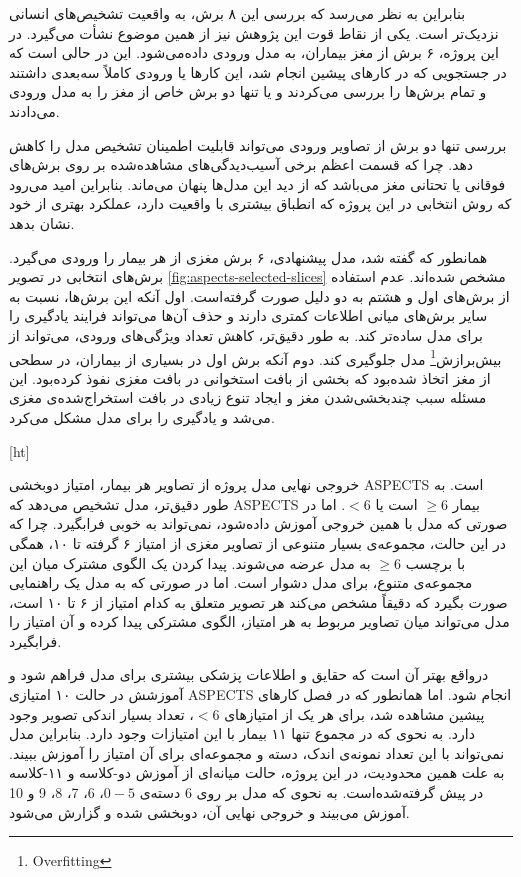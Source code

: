  بنابراین به نظر می‌رسد که بررسی این ۸ برش، به واقعیت تشخیص‌های انسانی نزدیک‌تر است.
 یکی از نقاط قوت این پژوهش نیز از همین موضوع نشأت می‌گیرد.
 در این پروژه، ۶ برش از مغز بیماران، به مدل ورودی داده‌می‌شود.
این در حالی است که در جستجویی که در کارهای پیشین
انجام شد، این کارها یا ورودی کاملاً سه‌بعدی داشتند و تمام برش‌ها را بررسی می‌کردند و یا تنها دو برش خاص از مغز را به مدل ورودی می‌دادند.

بررسی تنها دو برش از تصاویر ورودی می‌تواند قابلیت اطمینان تشخیص مدل را کاهش دهد.
چرا که قسمت اعظم برخی آسیب‌دیدگی‌های مشاهده‌شده
بر روی برش‌های فوقانی یا تحتانی مغز می‌باشد که از دید این مدل‌ها پنهان می‌ماند.
بنابراین امید می‌رود که روش انتخابی در این پروژه که انطباق بیشتری با واقعیت دارد، عملکرد بهتری از خود نشان بدهد.

همانطور که گفته شد، مدل پیشنهادی، ۶ برش مغزی از هر بیمار را ورودی می‌گیرد.
 برش‌های انتخابی در تصویر \ref{fig:aspects-selected-slices} مشخص شده‌اند.
 عدم استفاده از برش‌های اول و هشتم 
به دو دلیل صورت گرفته‌است.
اول آنکه این برش‌ها، نسبت به سایر برش‌های میانی اطلاعات کمتری دارند و حذف آن‌ها می‌تواند فرایند یادگیری را برای مدل ساده‌تر کند.
به طور دقیق‌تر، کاهش تعداد ویژگی‌های ورودی، می‌تواند از 
بیش‌برازش\footnote{Overfitting}
مدل جلوگیری کند.
دوم آنکه برش اول در بسیاری از بیماران، در سطحی از مغز اتخاذ شده‌بود که 
بخشی از بافت استخوانی در بافت مغزی نفوذ کرده‌بود.
این مسئله سبب چند‌بخشی‌شدن مغز و ایجاد تنوع زیادی در بافت استخراج‌شده‌ی مغزی می‌شد و یادگیری را برای مدل مشکل می‌کرد.

[ht]


خروجی نهایی مدل پروژه از تصاویر هر بیمار، امتیاز دوبخشی ASPECTS است.
به طور دقیق‌تر، مدل تشخیص می‌دهد که ASPECTS بیمار $\geq 6$ است یا $<6$.
اما در صورتی که مدل با همین خروجی آموزش داده‌شود،
نمی‌تواند به خوبی فرابگیرد.
چرا که در این حالت،
مجموعه‌ی بسیار متنوعی از تصاویر مغزی از
امتیاز ۶ گرفته تا ۱۰، همگی با برچسب
$\geq6$ به مدل عرضه می‌شوند.
پیدا کردن یک الگوی مشترک میان این مجموعه‌ی متنوع، برای مدل دشوار است.
اما در صورتی که به مدل یک راهنمایی صورت بگیرد که دقیقاً مشخص می‌کند هر تصویر متعلق به کدام امتیاز از ۶ تا ۱۰ است، مدل می‌تواند میان تصاویر مربوط به هر امتیاز، الگوی مشترکی پیدا کرده و آن امتیاز را فرابگیرد.

درواقع بهتر آن است که حقایق و اطلاعات پزشکی بیشتری برای مدل فراهم شود و آموزشش در حالت ۱۰ امتیازی ASPECTS انجام شود.
اما همانطور که در فصل کار‌های پیشین مشاهده شد، برای هر یک از امتیاز‌های $<6$، تعداد بسیار اندکی تصویر وجود دارد.
به نحوی که در مجموع تنها ۱۱ بیمار با این امتیازات وجود دارد.
بنابراین مدل نمی‌تواند با این تعداد نمونه‌ی اندک، دسته و مجموعه‌ای برای آن امتیاز را آموزش ببیند.
به علت همین محدودیت، در این پروژه، حالت میانه‌ای از آموزش دو-کلاسه و ۱۱-کلاسه در پیش گرفته‌شده‌است.
به نحوی که مدل بر روی 6 دسته‌ی $0-5$، 6، 7، 8، 9 و 10 آموزش می‌بیند و خروجی نهایی آن،‌ دوبخشی شده و گزارش می‌شود.

